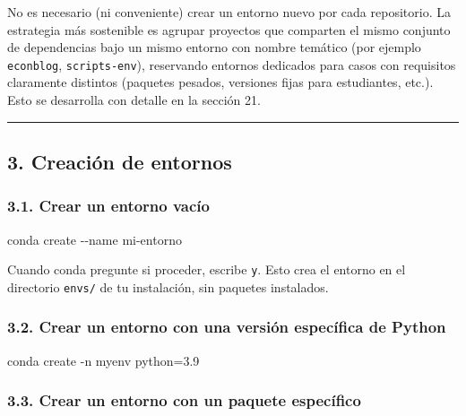 \documentclass[
  doc,
  floatsintext,
  longtable,
  a4paper,
  nolmodern,
  notxfonts,
  notimes,
  12pt,
  colorlinks=true,linkcolor=blue,citecolor=blue,urlcolor=blue]{apa7}
\newenvironment{Shaded}{\begin{snugshade}}{\end{snugshade}}
\newcommand{\AttributeTok}[1]{\textcolor[rgb]{0.40,0.45,0.13}{#1}}
\newcommand{\ExtensionTok}[1]{\textcolor[rgb]{0.00,0.23,0.31}{#1}}
\newcommand{\NormalTok}[1]{\textcolor[rgb]{0.00,0.23,0.31}{#1}}
\begin{document}
No es necesario (ni conveniente) crear un entorno nuevo por cada
repositorio. La estrategia más sostenible es agrupar proyectos que
comparten el mismo conjunto de dependencias bajo un mismo entorno con
nombre temático (por ejemplo \texttt{econblog}, \texttt{scripts-env}),
reservando entornos dedicados para casos con requisitos claramente
distintos (paquetes pesados, versiones fijas para estudiantes, etc.).
Esto se desarrolla con detalle en la sección 21.

\begin{center}\rule{0.5\linewidth}{0.5pt}\end{center}

\subsection{3. Creación de entornos}\label{creaciuxf3n-de-entornos}

\subsubsection{3.1. Crear un entorno
vacío}\label{crear-un-entorno-vacuxedo}

\begin{Shaded}
\begin{Highlighting}[]
\ExtensionTok{conda}\NormalTok{ create }\AttributeTok{{-}{-}name}\NormalTok{ mi{-}entorno}
\end{Highlighting}
\end{Shaded}

Cuando conda pregunte si proceder, escribe \texttt{y}. Esto crea el
entorno en el directorio \texttt{envs/} de tu instalación, sin paquetes
instalados.

\subsubsection{3.2. Crear un entorno con una versión específica de
Python}\label{crear-un-entorno-con-una-versiuxf3n-especuxedfica-de-python}

\begin{Shaded}
\begin{Highlighting}[]
\ExtensionTok{conda}\NormalTok{ create }\AttributeTok{{-}n}\NormalTok{ myenv python=3.9}
\end{Highlighting}
\end{Shaded}

\subsubsection{3.3. Crear un entorno con un paquete
específico}\label{crear-un-entorno-con-un-paquete-especuxedfico}
\end{document}
